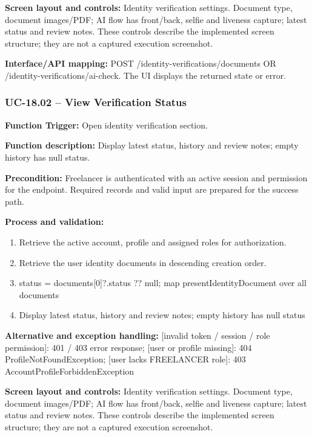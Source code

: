 \textbf{Screen layout and controls:} Identity verification settings. Document type, document images/\allowbreak{}PDF; AI flow has front/\allowbreak{}back, selfie and liveness capture; latest status and review notes. These controls describe the implemented screen structure; they are not a captured execution screenshot.

\textbf{Interface/\allowbreak{}API mapping:} POST /\allowbreak{}identity-verifications/\allowbreak{}documents OR /\allowbreak{}identity-verifications/\allowbreak{}ai-check. The UI displays the returned state or error.

\subsubsection{UC-18.02 -- View Verification Status}
\textbf{Function Trigger:} Open identity verification section.

\textbf{Function description:} Display latest status, history and review notes; empty history has null status.

\textbf{Precondition:} Freelancer is authenticated with an active session and permission for the endpoint. Required records and valid input are prepared for the success path.

\textbf{Process and validation:}
\begin{enumerate}
\item Retrieve the active account, profile and assigned roles for authorization.
\item Retrieve the user identity documents in descending creation order.
\item status =\allowbreak{} documents[0]?.status ?? null; map present\allowbreak{}Identity\allowbreak{}Document over all documents
\item Display latest status, history and review notes; empty history has null status
\end{enumerate}
\textbf{Alternative and exception handling:} [invalid token /\allowbreak{} session /\allowbreak{} role permission]: 401 /\allowbreak{} 403 error response; [user or profile missing]: 404 Profile\allowbreak{}Not\allowbreak{}Found\allowbreak{}Exception; [user lacks FREELANCER role]: 403 Account\allowbreak{}Profile\allowbreak{}Forbidden\allowbreak{}Exception

\textbf{Screen layout and controls:} Identity verification settings. Document type, document images/\allowbreak{}PDF; AI flow has front/\allowbreak{}back, selfie and liveness capture; latest status and review notes. These controls describe the implemented screen structure; they are not a captured execution screenshot.

